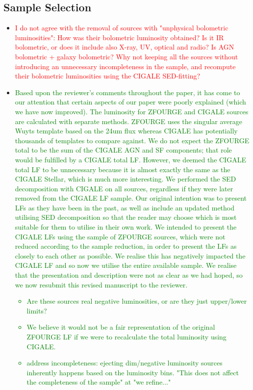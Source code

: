 \subsection{Sample Selection} \label{Sec: Sample Selection}
\begin{itemize}
    \item \textcolor{red}{I do not agree with the removal of sources with "unphysical bolometric luminosities": How was their bolometric luminosity obtained? Is it IR bolometric, or does it include also X-ray, UV, optical and radio? Is AGN bolometric + galaxy bolometric? Why not keeping all the sources without introducing an unnecessary incompleteness in the sample, and recompute their bolometric luminosities using the CIGALE SED-fitting?}
    
    \item \textcolor{Green}{Based upon the reviewer's comments throughout the paper, it has come to our attention that certain aspects of our paper were poorly explained (which we have now improved). The luminosity for ZFOURGE and CIGALE sources are calculated with separate methods. ZFOURGE uses the singular average Wuyts template based on the 24um flux whereas CIGALE has potentially thousands of templates to compare against. We do not expect the ZFOURGE total to be the sum of the CIGALE AGN and SF components; that role would be fulfilled by a CIGALE total LF. However, we deemed the CIGALE total LF to be unnecessary because it is almost exactly the same as the CIGALE Stellar, which is much more interesting. We performed the SED decomposition with CIGALE on all sources, regardless if they were later removed from the CIGALE LF sample. Our original intention was to present LFs as they have been in the past, as well as include an updated method utilising SED decomposition so that the reader may choose which is most suitable for them to utilise in their own work. We intended to present the CIGALE LFs using the sample of ZFOURGE sources, which were not reduced according to the sample reduction, in order to present the LFs as closely to each other as possible. We realise this has negatively impacted the CIGALE LF and so now we utilise the entire available sample. We realise that the presentation and description were not as clear as we had hoped, so we now resubmit this revised manuscript to the reviewer.
    \begin{itemize}
        \item Are these sources real negative luminosities, or are they just upper/lower limits?
        \item We believe it would not be a fair representation of the original ZFOURGE LF if we were to recalculate the total luminosity using CIGALE.
        \item address incompleteness: ejecting dim/negative luminosity sources inherently happens based on the luminosity bins. "This does not affect the completeness of the sample" at "we refine..." 
    \end{itemize}
    }
\end{itemize}

